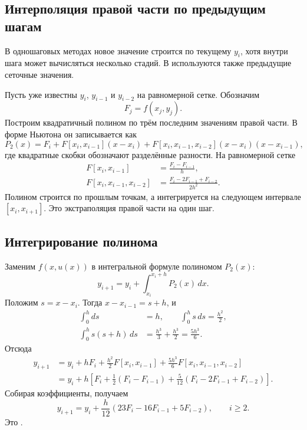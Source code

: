 \documentclass[../final.tex]{subfiles}
\begin{document}
\subsection{Интерполяция правой части по предыдущим шагам}

В одношаговых методах новое значение строится по текущему $y_i$,
хотя внутри шага может вычисляться несколько стадий. В
 используются также предыдущие
сеточные значения.

Пусть уже известны $y_i$, $y_{i-1}$ и $y_{i-2}$ на равномерной сетке.
Обозначим
\begin{equation*}
    F_j=f(x_j,y_j).
\end{equation*}
Построим квадратичный полином по трём последним значениям правой части.
В форме Ньютона он записывается как
\begin{equation*}
    P_2(x)=F_i+F[x_i,x_{i-1}](x-x_i)
    +F[x_i,x_{i-1},x_{i-2}](x-x_i)(x-x_{i-1}),
\end{equation*}
где квадратные скобки обозначают разделённые разности. На равномерной сетке
\begin{align*}
    F[x_i,x_{i-1}]&=\frac{F_i-F_{i-1}}h,\\
    F[x_i,x_{i-1},x_{i-2}]
        &=\frac{F_i-2F_{i-1}+F_{i-2}}{2h^2}.
\end{align*}
Полином строится по прошлым точкам, а интегрируется на следующем
интервале $[x_i,x_{i+1}]$. Это экстраполяция правой части на один шаг.

\subsection{Интегрирование полинома}

Заменим $f(x,u(x))$ в интегральной формуле полиномом $P_2(x)$:
\begin{equation*}
    y_{i+1}=y_i+\int_{x_i}^{x_i+h}P_2(x)\,dx.
\end{equation*}
Положим $s=x-x_i$. Тогда $x-x_{i-1}=s+h$, и
\begin{align*}
    \int_0^h ds&=h,\qquad \int_0^h s\,ds=\frac{h^2}{2},\\
    \int_0^h s(s+h)\,ds
        &=\frac{h^3}{3}+\frac{h^3}{2}=\frac{5h^3}{6}.
\end{align*}
Отсюда
\begin{align*}
    y_{i+1}
    &=y_i+hF_i+\frac{h^2}{2}F[x_i,x_{i-1}]
        +\frac{5h^3}{6}F[x_i,x_{i-1},x_{i-2}]\\
    &=y_i+h\left[F_i+\frac12(F_i-F_{i-1})
        +\frac5{12}(F_i-2F_{i-1}+F_{i-2})\right].
\end{align*}
Собирая коэффициенты, получаем
\begin{equation*}
    y_{i+1}=y_i+\frac h{12}
    \left(23F_i-16F_{i-1}+5F_{i-2}\right),\qquad i\ge2.
\end{equation*}
Это .
\end{document}
